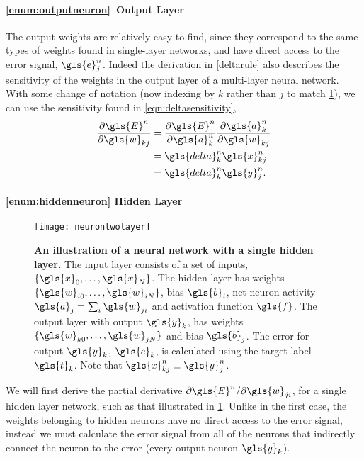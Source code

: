 \documentclass[thesis]{subfiles}
\begin{document}
\paragraph{\ref{enum:outputneuron}~Output Layer}
The output weights are relatively easy to find, since they correspond to the same types of weights found in single-layer networks, and have direct access to the error signal, \ie$\gls{e}^n_j$. Indeed the derivation in \cref{deltarule} also describes the sensitivity of the weights in the output layer of a multi-layer neural network. With some change of notation (now indexing by $k$ rather than $j$ to match \cref{fig:neurontwolayer}), we can use the sensitivity found in \cref{eqn:deltasensitivity},
%
\begin{equation}
\begin{aligned}
    \frac{\partial \gls{E}^n}{\partial \gls{w}_{kj}} &= \frac{\partial \gls{E}^n}{\partial \gls{a}^n_k} \frac{\partial \gls{a}^n_k}{\partial \gls{w}_{kj}}\\
    &= \gls{delta}^n_k \gls{x}^n_{kj}\\
    &= \gls{delta}^n_k \gls{y}^n_j.
\end{aligned}
\label{eqn:outputlayer}
\end{equation}
%
\paragraph{\ref{enum:hiddenneuron} Hidden Layer}
\begin{figure}[tbp]
\centering
\texttt{[image: neurontwolayer]}
\caption[An illustration of a neural network with a single hidden layer]{\textbf{An illustration of a neural network with a single hidden layer.} The input layer consists of a set of inputs, $\{\gls{x}_{0}, \ldots, \gls{x}_{N}\}$. The hidden layer has weights $\{\gls{w}_{i0}, \ldots, \gls{w}_{iN}\}$, bias $\gls{b}_i$, net neuron activity $\gls{a}_j = \sum_i \gls{w}_{ji}$ and activation function $\gls{f}$. The output layer with output $\gls{y}_k$, has weights $\{\gls{w}_{k0}, \ldots, \gls{w}_{jN}\}$ and bias $\gls{b}_j$. The error for output $\gls{y}_k$, $\gls{e}_k$, is calculated using the target label $\gls{t}_k$. Note that $\gls{x}^n_{kj} \equiv \gls{y}^n_j$.}
\label{fig:neurontwolayer}
\end{figure}
We will first derive the partial derivative ${\partial \gls{E}^n}/{\partial \gls{w}_{ji}}$, for a single hidden layer network, such as that illustrated in \cref{fig:neurontwolayer}. Unlike in the first case, the weights belonging to hidden neurons have no direct access to the error signal, instead we must calculate the error signal from all of the neurons that indirectly connect the neuron to the error (\ie every output neuron $\gls{y}_k$).
\end{document}
